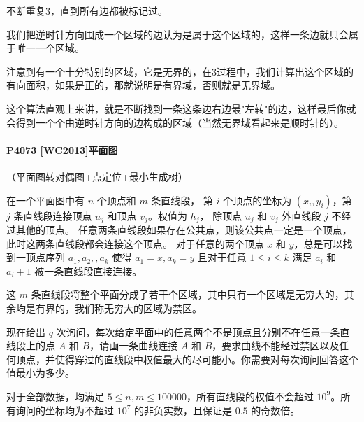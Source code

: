 \documentclass{ctexart}
\begin{document}
不断重复$3$，直到所有边都被标记过。

我们把逆时针方向围成一个区域的边认为是属于这个区域的，这样一条边就只会属于唯一一个区域。

注意到有一个十分特别的区域，它是无界的，在$3$过程中，我们计算出这个区域的有向面积，如果是正的，那就说明是有界域，否则就是无界域。

这个算法直观上来讲，就是不断找到一条这条边右边最"左转"的边，这样最后你就会得到一个个由逆时针方向的边构成的区域（当然无界域看起来是顺时针的）。

\paragraph{P4073 [WC2013]平面图}
（平面图转对偶图+点定位+最小生成树）

在一个平面图中有 $n$ 个顶点和 $m$ 条直线段，
第 $i$ 个顶点的坐标为 $(x_i,y_i)$，第 $j$ 条直线段连接顶点 $u_j$ 和顶点 $v_j$。权值为 $h_j$，
除顶点 $u_j$ 和 $v_j$ 外直线段 $j$ 不经过其他的顶点。
任意两条直线段如果存在公共点，则该公共点一定是一个顶点，此时这两条直线段都会连接这个顶点。
对于任意的两个顶点 $x$ 和 $y$，总是可以找到一顶点序列 $a_1,a_2,\dot,a_k$ 使得 $a_1=x,a_k=y$ 且对于任意 $1\le i\le k$ 满足 $a_i$ 和 $a_i+1$ 被一条直线段直接连接。

这 $m$ 条直线段将整个平面分成了若干个区域，其中只有一个区域是无穷大的，其余均是有界的，我们称无穷大的区域为禁区。

现在给出 $q$ 次询问，每次给定平面中的任意两个不是顶点且分别不在任意一条直线段上的点 $A$ 和 $B$，请画一条曲线连接 $A$ 和 $B$，要求曲线不能经过禁区以及任何顶点，并使得穿过的直线段中权值最大的尽可能小。你需要对每次询问回答这个值最小为多少。

对于全部数据，均满足 $5\le n,m\le 100000$，所有直线段的权值不会超过 $10^9$。所有询问的坐标均为不超过 $10^7$ 的非负实数，且保证是 $0.5$ 的奇数倍。
\end{document}
